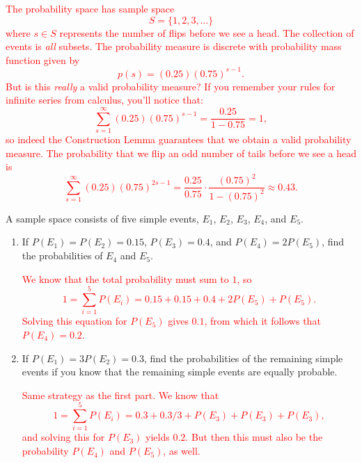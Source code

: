 \documentclass[12pt,reqno]{amsart}
\begin{document}
\begin{enumerate}
\bigskip
\textcolor{red}{The probability space has sample space
	\[
	S = \{ 1, 2, 3,\ldots\}
	\]
where $s\in S$ represents the number of flips before we see a head. The collection of events is \textit{all} subsets. The probability measure is discrete with probability mass function given by
	\[
	p(s) = (0.25)(0.75)^{s-1}.
	\]
But is this \textit{really} a valid probability measure? If you remember your rules for infinite series from calculus, you'll notice that:
	\[
	\sum_{s=1}^\infty (0.25)(0.75)^{s-1} = \frac{0.25}{1-0.75} = 1,
	\]
so indeed the Construction Lemma guarantees that we obtain a valid probability measure. The probability that we flip an odd number of tails before we see a head is
	\[
	\sum_{s=1}^\infty (0.25)(0.75)^{2s-1} = \frac{0.25}{0.75} \cdot \frac{(0.75)^2}{1-(0.75)^2} \approx 0.43.
	\]}
\end{enumerate}

















\bigskip
\prob A sample space consists of five simple events, $E_1$, $E_2$, $E_3$, $E_4$, and $E_5$.

\medskip
\begin{enumerate}
\item If $P(E_1) = P(E_2) = 0.15$, $P(E_3) = 0.4$, and $P(E_4) = 2P(E_5)$, find the probabilities of $E_4$ and $E_5$.
    
\bigskip
\textcolor{red}{We know that the total probability must sum to $1$, so
	\[
	1 = \sum_{i=1}^5P(E_i) = 0.15 + 0.15 + 0.4 + 2P(E_5) + P(E_5).
	\]
Solving this equation for $P(E_5)$ gives $0.1$, from which it follows that $P(E_4)=0.2$.}
\bigskip

\item If $P(E_1) = 3P(E_2) = 0.3$, find the probabilities of the remaining simple events if you know that the remaining simple events are equally probable.
    
\bigskip
\textcolor{red}{Same strategy as the first part. We know that
	\[
	1 = \sum_{i=1}^5P(E_i) = 0.3 + 0.3/3 + P(E_3) + P(E_3) + P(E_3),
	\]
and solving this for $P(E_3)$ yields $0.2$. But then this must also be the probability $P(E_4)$ and $P(E_5)$, as well.}
    
\end{enumerate}
\end{document}

